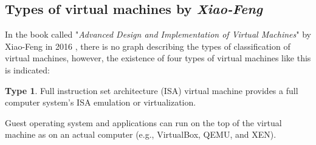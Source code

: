 	\subsection{Types of virtual machines by \textit{Xiao-Feng}}
	
	In the book called "\textit{Advanced Design and Implementation of Virtual Machines}" by Xiao-Feng in 2016 \cite{Xiao-Feng2016}, there is no graph describing the types of classification of virtual machines, however, the existence of four types of virtual machines like this is indicated:
	
	\textbf{Type 1}. Full instruction set architecture (ISA) virtual machine provides a full computer system's ISA emulation or virtualization. 
	
	Guest operating system and applications can run on the top of the virtual machine as on an actual computer (e.g., VirtualBox, QEMU, and XEN).
	
	
